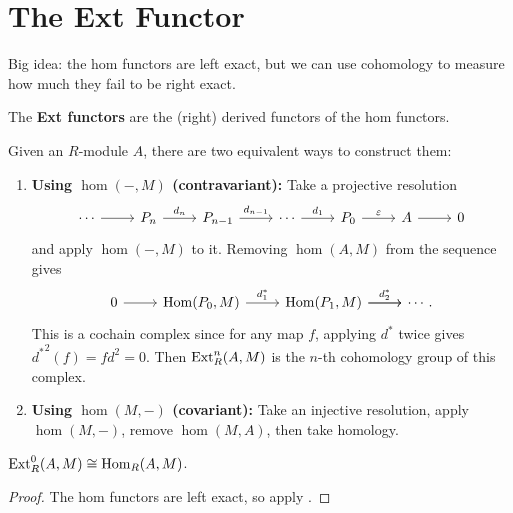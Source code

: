 \documentclass[twoside,10pt]{report}
\begin{document}
\section{The Ext Functor}

\begin{note}[]
Big idea: the hom functors are left exact, but we can use cohomology to measure how much they fail to be right exact.
\end{note}

\begin{defn}[]
	The \textbf{Ext functors} are the (right) derived functors of the hom functors.
\end{defn}

Given an $R$-module $A$, there are two equivalent ways to construct them:
\begin{enumerate}
	\item \textbf{Using $\hom(-,M)$ (contravariant):} Take a projective resolution
\[
\begin{tikzcd}
	\cdots \rar & P_{n}\rar{d_{n}} & P_{n-1}\rar{d_{n-1}} & \cdots \rar{d_1} & P_0 \rar{\varepsilon} & A \rar & 0
\end{tikzcd}
\] 
and apply $\hom(-,M)$ to it. Removing $\hom(A,M)$ from the sequence gives
\[
	\begin{tikzcd}
		0 \rar & \hom(P_0,M) \rar{d_1^{*}} & \hom(P_1,M)\rar{d_2^{*}} \rar & \cdots.
	\end{tikzcd}
\] 
This is a cochain complex since for any map $f$, applying $d^{*}$ twice gives ${d^{*}}^2(f) = fd^2=0$. Then $\operatorname{\text{Ext}}_{R}^{n}(A,M)$ is the $n$-th cohomology group of this complex.

	\item \textbf{Using $\hom(M,-)$ (covariant):} Take an injective resolution, apply $\hom(M,-)$, remove $\hom(M,A)$, then take homology. 
\end{enumerate}

\begin{prop}
	$\operatorname{\text{Ext}}_{R}^{0}(A,M)\cong \operatorname{Hom}_{R}(A,M)$.
\end{prop}
\begin{proof}
	The hom functors are left exact, so apply .
\end{proof}

\end{document}
